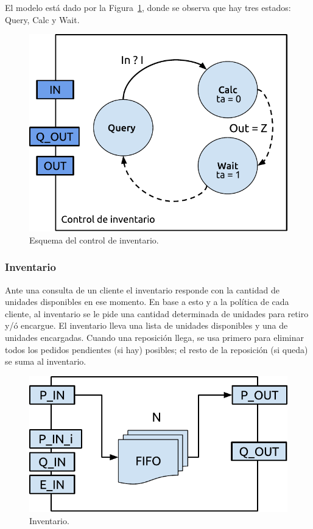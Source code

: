 \documentclass[10pt]{article}
\begin{document}
El modelo está dado por la Figura~\ref{fig:fig6}, donde se observa que hay tres estados: Query, Calc y Wait.

\begin{figure}[h]
\centering
\includegraphics[scale=1]{img/figura6}
\caption{Esquema del control de inventario.}
\label{fig:fig6}
\end{figure}
\FloatBarrier

\subsubsection{Inventario}

Ante una consulta de un cliente el inventario responde con la cantidad de unidades disponibles en ese momento. En base a esto y a la política de cada cliente, al inventario se le pide una cantidad determinada de unidades para retiro y/ó encargue.
El inventario lleva una lista de unidades disponibles y una de unidades encargadas. Cuando una reposición llega, se usa primero para eliminar todos los pedidos pendientes (si hay) posibles; el resto de la reposición (si queda) se suma al inventario. 

\begin{figure}[h]
\centering
\includegraphics[scale=1]{img/figura7}
\caption{Inventario.}
\label{fig:fig7}
\end{figure}
\end{document}
